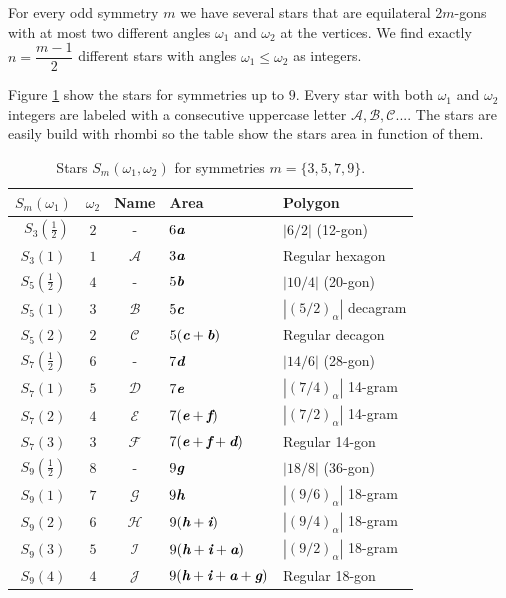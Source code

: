 \documentclass[11pt]{article}
\def\mathbi#1{\textbf{\em #1}}
\begin{document}
For every odd symmetry $m$ we have several stars that are equilateral 2$m$-gons with at most two different angles $\omega_1$ and $\omega_2$ at the vertices. We find exactly $n = \dfrac{m-1}2$ different stars with angles $\omega_1 \leq \omega_2$ as integers.

Figure \ref{tbl:stars} show the stars for symmetries up to $9$. Every star with both $\omega_1$ and $\omega_2$ integers are labeled with a consecutive uppercase letter $\mathcal{A}, \mathcal{B}, \mathcal{C}...$. The stars are easily build with rhombi so the table show the stars area in function of them.

\begin{table}[H]
\begin{center}
\begin{tabular}{|c|c|c|l|l|}
\hline
$S_m(\omega_1)$ & $\omega_2$ & Name & Area & Polygon \\ \hline\
$S_3(\frac{1}2)$ & $2$ & -     & $6\mathbi{a}$ & $|6/2|$ (12-gon) \\[0.5ex]
$S_3(1)$         & $1$ & $\mathcal{A}$ & $3\mathbi{a}$ & Regular hexagon \\[0.5ex]
\hline
$S_5(\frac{1}2)$ & $4$ & -      & $5\mathbi{b}$ & $|10/4|$ (20-gon)\\[0.5ex]
$S_5(1)$ & $3$ & $\mathcal{B}$ & $5\mathbi{c}$ & $|(5/2)_\alpha|$ decagram\\[0.5ex]
$S_5(2)$ & $2$ & $\mathcal{C}$ & $5(\mathbi{c}+\mathbi{b})$ & Regular decagon\\[0.5ex]
\hline
$S_7(\frac{1}2)$ & $6$ & -     & $7\mathbi{d}$ & $|14/6|$ (28-gon)\\[0.5ex]
$S_7(1)$ & $5$ & $\mathcal{D}$ & $7\mathbi{e}$ & $|(7/4)_\alpha|$ 14-gram\\[0.5ex]
$S_7(2)$ & $4$ & $\mathcal{E}$ & $7(\mathbi{e}+\mathbi{f})$ & $|(7/2)_\alpha|$ 14-gram\\[0.5ex]
$S_7(3)$ & $3$ & $\mathcal{F}$ & $7(\mathbi{e}+\mathbi{f}+\mathbi{d})$ & Regular 14-gon\\[0.5ex]
\hline
$S_9(\frac{1}2)$ & $8$ & -     & $9\mathbi{g}$ & $|18/8|$ (36-gon)\\[0.5ex]
$S_9(1)$ & $7$ & $\mathcal{G}$ & $9\mathbi{h}$ & $|(9/6)_\alpha|$ 18-gram\\[0.5ex]
$S_9(2)$ & $6$ & $\mathcal{H}$ & $9(\mathbi{h}+\mathbi{i})$ & $|(9/4)_\alpha|$ 18-gram\\[0.5ex]
$S_9(3)$ & $5$ & $\mathcal{I}$ & $9(\mathbi{h}+\mathbi{i}+\mathbi{a})$ & $|(9/2)_\alpha|$ 18-gram\\[0.5ex]
$S_9(4)$ & $4$ & $\mathcal{J}$ & $9(\mathbi{h}+\mathbi{i}+\mathbi{a}+\mathbi{g})$ & Regular 18-gon\\[0.5ex]
\hline
\end{tabular}
\caption{Stars $S_m(\omega_1,\omega_2)$ for symmetries $m=\{3,5,7,9\}$.}
\label{tbl:stars}
\end{center}
\end{table}
\end{document}
